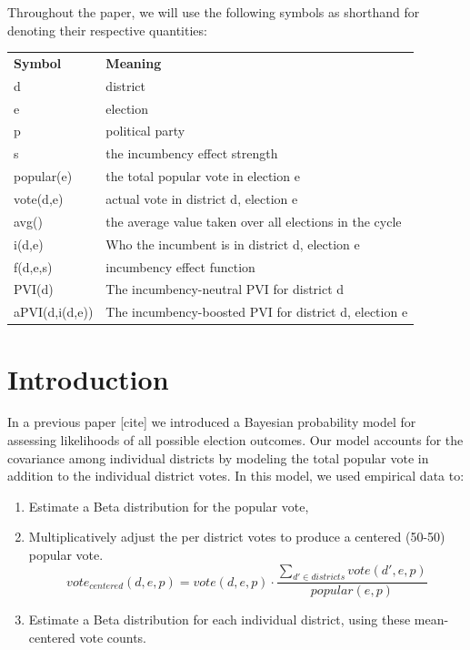 \documentclass[preprint,12pt]{article}
\begin{document}
Throughout the paper, we will use the following symbols as shorthand for denoting their respective quantities:


\begin{tabular}{ll}
\textbf{Symbol} & \textbf{Meaning}                                        \\
d               & district                                                \\
e               & election                                                \\
p               & political party                                         \\
s               & the incumbency effect strength                          \\
popular(e)      & the total popular vote in election e                    \\
vote(d,e)       & actual vote in district d, election e                   \\
avg()           & the average value taken over all elections in the cycle \\
i(d,e)          & Who the incumbent is in district d, election e          \\
f(d,e,s)               & incumbency effect function                              \\
PVI(d)          & The incumbency-neutral PVI for district d                                   \\
aPVI(d,i(d,e))       & The incumbency-boosted PVI for district d, election e   
\end{tabular}


\section{Introduction}

In a previous paper [cite] we introduced a Bayesian probability model for assessing likelihoods of all possible election outcomes.  Our model accounts for the covariance among individual districts by modeling the total popular vote in addition to the individual district votes.   In this model, we used empirical data to:
 
\begin{enumerate}
\item Estimate a Beta distribution for the popular vote,
\item Multiplicatively adjust the per district votes to produce a centered (50-50) popular vote.
\begin{equation}
vote_{centered}(d,e,p) = 
vote(d,e,p) \cdot \frac{ \sum_{d' \in districts}{vote(d',e,p)}}{popular(e,p) } 
\end{equation}

\item Estimate a Beta distribution for each individual district, using these mean-centered vote counts.
\end{enumerate}
\end{document}
